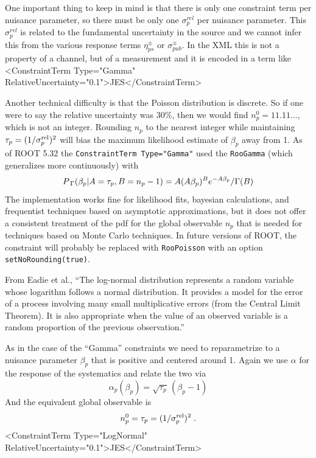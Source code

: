 One important thing to keep in mind is that there is only one constraint term per nuisance parameter, so there must be only one $\sigma_p^{rel}$ per nuisance parameter.  This $\sigma_p^{rel}$ is related to the fundamental uncertainty in the source and we cannot infer this from the various response terms $\eta_{ps}^\pm$ or $\sigma_{pub}^\pm$.  In the XML this is not a property of a channel, but of a measurement and it is encoded in a term like 
{\tiny
   <ConstraintTerm Type="Gamma" RelativeUncertainty="0.1">JES</ConstraintTerm>
}

Another technical difficulty is that the Poisson distribution is discrete. So if one were to say the relative uncertainty was 30\%, then we would find $n_p^0=11.11...$, which is not an integer.  Rounding $n_p$ to the nearest integer while maintaining $\tau_p= (1/\sigma_{p}^{\rm rel})^2$ will bias the maximum likelihood estimate of $\beta_p$ away from 1.  As of ROOT 5.32 the \texttt{ConstraintTerm Type="Gamma"} used the \texttt{RooGamma} (which generalizes more continuously) with 
\begin{equation}
{\ensuremath{P_{\;\Gamma}}}(\beta_p | A=\tau_p, B=n_p-1) = A (A \beta_p)^{B} e^{-A \beta_p} / \Gamma(B)
\end{equation}
The implementation works fine for likelihood fits, bayesian calculations, and frequentist techniques based on asymptotic approximations, but it does not offer a consistent treatment of the pdf for the global observable $n_p$ that is needed for techniques based on Monte Carlo techniques.  In future versions of ROOT, the constraint will probably be replaced with \texttt{RooPoisson} with an option \texttt{setNoRounding(true)}.




From Eadie et al., ``The log-normal distribution represents a random variable whose logarithm follows a normal distribution. It provides a model for the error of a process involving many small multiplicative errors (from the Central Limit Theorem). It is also appropriate when the value of an observed variable is a random proportion of the previous observation.''

As in the case of the ``Gamma'' constraints we need to reparametrize to a nuisance parameter $\beta_p$ that is positive and centered around 1.  Again we use $\alpha$ for the response of the systematics and relate the two via
\begin{equation}
\alpha_p(\beta_p) = \sqrt{\tau_p}\,(\beta_p -1)
\end{equation}
And the equivalent global observable is
\begin{equation}
n_p^0 =  \tau_p = (1/\sigma_{p}^{\rm rel})^2\; .
\end{equation}
{\tiny
   <ConstraintTerm Type="LogNormal" RelativeUncertainty="0.1">JES</ConstraintTerm>
}


